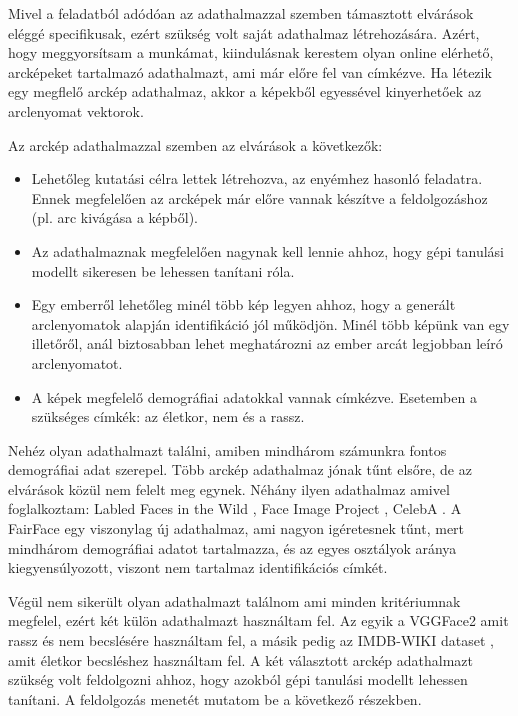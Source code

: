 Mivel a feladatból adódóan az adathalmazzal szemben támasztott elvárások eléggé specifikusak, ezért szükség volt saját adathalmaz létrehozására. Azért, hogy meggyorsítsam a munkámat, kiindulásnak kerestem olyan online elérhető, arcképeket tartalmazó adathalmazt, ami már előre fel van címkézve. Ha létezik egy megflelő arckép adathalmaz, akkor a képekből egyessével kinyerhetőek az arclenyomat vektorok. 

Az arckép adathalmazzal szemben az elvárások a következők:
\begin{itemize}
	\item Lehetőleg kutatási célra lettek létrehozva, az enyémhez hasonló feladatra. Ennek megfelelően az arcképek már előre vannak készítve a feldolgozáshoz (pl. arc kivágása a képből).
	\item Az adathalmaznak megfelelően nagynak kell lennie ahhoz, hogy gépi tanulási modellt sikeresen be lehessen tanítani róla.
	\item Egy emberről lehetőleg minél több kép legyen ahhoz, hogy a generált arclenyomatok alapján identifikáció jól működjön. Minél több képünk van egy illetőről, anál biztosabban lehet meghatározni az ember arcát legjobban leíró arclenyomatot.
	\item A képek megfelelő demográfiai adatokkal vannak címkézve. Esetemben a szükséges címkék: az életkor, nem és a rassz.
\end{itemize}

Nehéz olyan adathalmazt találni, amiben mindhárom számunkra fontos demográfiai adat szerepel. Több arckép adathalmaz jónak tűnt elsőre, de az elvárások közül nem felelt meg egynek. Néhány ilyen adathalmaz amivel foglalkoztam: Labled Faces in the Wild \cite{labledfacesinthewild2008}, Face Image Project \cite{faceimageproject2014}, CelebA \cite{celebA2015}. A FairFace \cite{fairface2021} egy viszonylag új adathalmaz, ami nagyon igéretesnek tűnt, mert mindhárom demográfiai adatot tartalmazza, és az egyes osztályok aránya kiegyensúlyozott, viszont nem tartalmaz identifikációs címkét.

Végül nem sikerült olyan adathalmazt találnom ami minden kritériumnak megfelel, ezért két külön adathalmazt használtam fel. Az egyik a VGGFace2 \cite{vggface22018} amit rassz és nem becslésére használtam fel, a másik pedig az IMDB-WIKI dataset \cite{imdbwiki2018}, amit életkor becsléshez használtam fel. A két választott arckép adathalmazt szükség volt feldolgozni ahhoz, hogy azokból gépi tanulási modellt lehessen tanítani. A feldolgozás menetét mutatom be a következő részekben.

